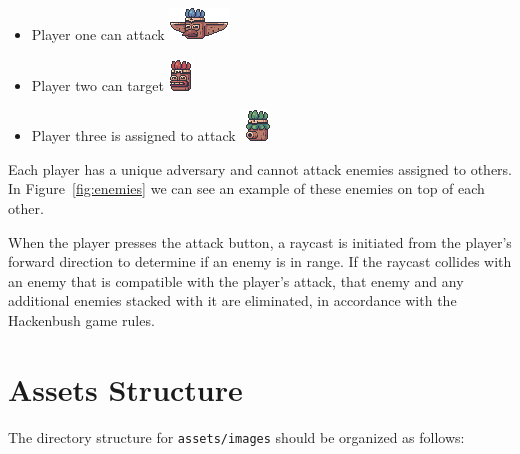 \documentclass[12pt,a4paper,hidelinks]{report}
\begin{document}
\begin{itemize}
  \item Player one can attack \includegraphics[height=\fontcharht\font`\B]{assets/enemy-1.png}
  \item Player two can target \includegraphics[height=\fontcharht\font`\B]{assets/enemy-2.png}
  \item Player three is assigned to attack \includegraphics[height=\fontcharht\font`\B]{assets/enemy-3.png}
\end{itemize}

Each player has a unique adversary and cannot attack enemies assigned to others. In Figure~\ref{fig:enemies} we can see an example of these enemies on top of each other.
\par
When the player presses the attack button, a raycast is initiated from the player's forward direction to determine if an enemy is in range. If the raycast collides with an enemy that is compatible with the player's attack, that enemy and any additional enemies stacked with it are eliminated, in accordance with the Hackenbush game rules.

\appendix

\chapter{Assets Structure}

The directory structure for \verb|assets/images| should be organized as follows:
\end{document}
